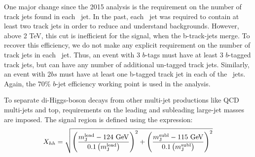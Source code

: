 One major change since the 2015 analysis is the requirement on the number of track jets found in each \largeR\ jet.  In the past, each \largeR\ jet was required to contain at least two track jets in order to reduce and understand backgrounds.  However, above 2 TeV, this cut is inefficient for the signal, when the b-track-jets merge.  To recover this efficiency, we do not make any explicit requirement on the number of track jets in each \largeR\ jet.  Thus, an event with 3 $b$-tags must have at least 3 $b$-tagged track jets, but can have any number of additional un-tagged track jets. Similarly, an event with $2bs$ must have at least one b-tagged track jet in each of the \largeR\ jets. Again, the 70\% $b$-jet efficiency working point is used in the analysis.

To separate di-Higgs-boson decays from other multi-jet productions like QCD multi-jets and top, requirements on the leading and subleading large-\R jet masses are imposed. The signal region is defined using the expression:
\begin{equation}
\label{eq:boosted_XhhDef}
X_{hh} = \sqrt{\left(\frac{m^{\rm lead}_{\rm J} - \text{124 GeV}}{0.1 \left(m^{\rm lead}_{\rm J}\right)}\right)^2 + \left(\frac{m^{\rm subl}_{\rm J}- \text{115 GeV}}{0.1 \left(m^{\rm subl}_{\rm J}\right)}\right)^2}
\end{equation}

